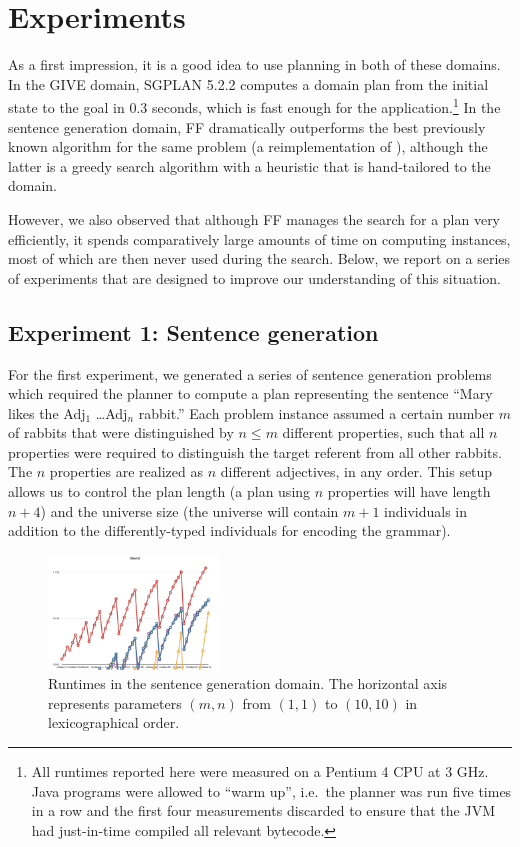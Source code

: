 \section{Experiments} \label{sec:experiments}

As a first impression, it is a good idea to use planning in both of
these domains.  In the GIVE domain, SGPLAN 5.2.2 computes a domain
plan from the initial state to the goal in 0.3 seconds, which is fast
enough for the application.\footnote{All runtimes reported here were
  measured on a Pentium 4 CPU at 3 GHz.  Java programs were allowed to
  ``warm up'', i.e.\ the planner was run five times in a row and the
  first four measurements discarded to ensure that the JVM had
  just-in-time compiled all relevant bytecode.}  In the sentence
generation domain, FF dramatically outperforms the best previously
known algorithm for the same problem (a reimplementation of
\cite{Stone2003a}), although the latter is a greedy search algorithm
with a heuristic that is hand-tailored to the domain.

However, we also observed that although FF manages the search for a
plan very efficiently, it spends comparatively large amounts of time
on computing instances, most of which are then never used during the
search.  Below, we report on a series of experiments that are designed
to improve our understanding of this situation.

\subsection{Experiment 1: Sentence generation}
\label{sec:exper-1:-sent}

For the first experiment, we generated a series of sentence generation
problems which required the planner to compute a plan representing the
sentence ``Mary likes the Adj$_1$ \ldots Adj$_n$ rabbit.''  Each
problem instance assumed a certain number $m$ of rabbits that were
distinguished by $n \leq m$ different properties, such that all $n$
properties were required to distinguish the target referent from all
other rabbits.  The $n$ properties are realized as $n$ different
adjectives, in any order.  This setup allows us to control the plan
length (a plan using $n$ properties will have length $n+4$) and the
universe size (the universe will contain $m+1$ individuals in addition
to the differently-typed individuals for encoding the grammar).

\begin{figure}
  \centering
  \includegraphics[width=0.4\textwidth]{pic-runtime-modifiers-with-sgplan}
  \caption{Runtimes in the sentence generation domain.  The horizontal
  axis represents parameters $(m,n)$ from $(1,1)$ to $(10,10)$ in
  lexicographical order.}
  \label{fig:runtimes-crisp}
\end{figure}

